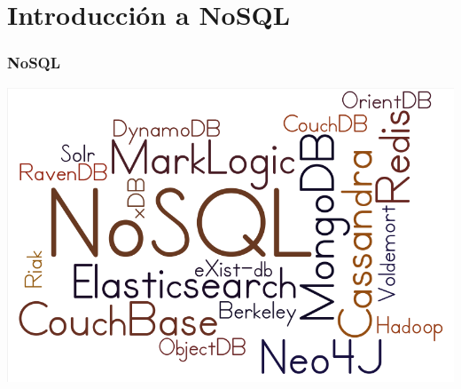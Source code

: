 \documentclass[14pt]{beamer}
\begin{document}






\section{Introducción a NoSQL}

\begin{frame}
  \frametitle{NoSQL}
  \includegraphics[width=\textwidth]{img/nosql}
\end{frame}
\end{document}
